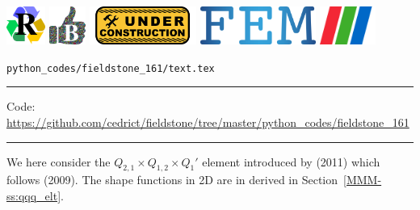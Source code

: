 \noindent
\includegraphics[height=1.25cm]{images/pictograms/replication}
\includegraphics[height=1.25cm]{images/pictograms/benchmark}
\includegraphics[height=1.25cm]{images/pictograms/under_construction}
\includegraphics[height=1.25cm]{images/pictograms/FEM}
\includegraphics[height=1.25cm]{images/pictograms/paraview}


\begin{flushright} {\tiny {\color{gray} \tt python\_codes/fieldstone\_161/text.tex}} \end{flushright}

%

\par\noindent\rule{\textwidth}{0.4pt}

\begin{center}
\inpython
{\small Code: \url{https://github.com/cedrict/fieldstone/tree/master/python_codes/fieldstone_161}}
\end{center}

\par\noindent\rule{\textwidth}{0.4pt}


We here consider the $Q_{2,1}\times Q_{1,2} \times Q_{1}'$ element introduced 
by \textcite{huzh11} (2011) which follows \textcite{zhan09} (2009).
The shape functions in 2D are in derived in Section~\ref{MMM-ss:qqq_elt}.

